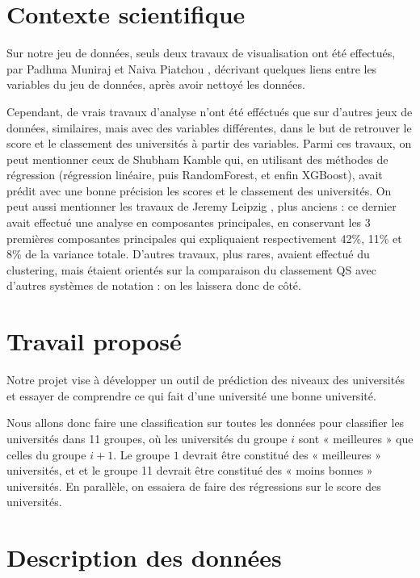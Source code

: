 \documentclass[twocolumns]{udes_rapport}
\begin{document}
\section{Contexte scientifique}\label{sec:context}

    Sur notre jeu de données, seuls deux travaux de visualisation ont été effectués, par Padhma Muniraj \cite{trav1} et Naiva Piatchou \cite{trav2}, décrivant quelques liens entre les variables du jeu de données, après avoir nettoyé les données.

    Cependant, de vrais travaux d'analyse n'ont été efféctués que sur d'autres jeux de données, similaires, mais avec des variables différentes, dans le but de retrouver le score et le classement des universités à partir des variables. Parmi ces travaux, on peut mentionner ceux de Shubham Kamble \cite{trav3} qui, en utilisant des méthodes de régression (régression linéaire, puis RandomForest, et enfin XGBoost), avait prédit avec une bonne précision les scores et le classement des universités. On peut aussi mentionner les travaux de Jeremy Leipzig \cite{trav4}, plus anciens : ce dernier avait effectué une analyse en composantes principales, en conservant les 3 premières composantes principales qui expliquaient respectivement 42\%, 11\% et 8\% de la variance totale. D'autres travaux, plus rares, avaient effectué du clustering, mais étaient orientés sur la comparaison du classement QS avec d'autres systèmes de notation : on les laissera donc de côté.

\section{Travail proposé}\label{sec:work}

    Notre projet vise à développer un outil de prédiction des niveaux des universités et essayer de comprendre ce qui fait d'une université une bonne université.
    
    Nous allons donc faire une classification sur toutes les données pour classifier les universités dans 11 groupes, où les universités du groupe $i$ sont « meilleures » que celles du groupe $i+1$. Le groupe $1$ devrait être constitué des « meilleures » universités, et et le groupe 11 devrait être constitué des « moins bonnes » universités. En parallèle, on essaiera de faire des régressions sur le score des universités.


\section{Description des données}\label{sec:data_description}
\end{document}
